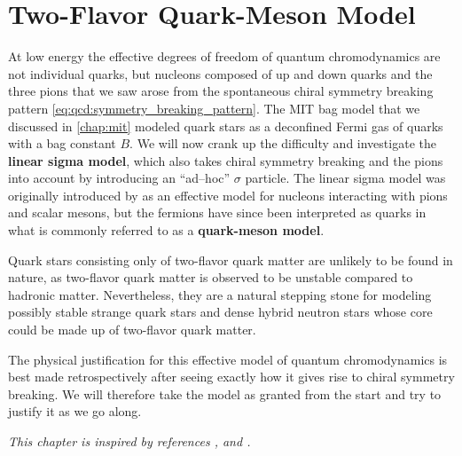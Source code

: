 \chapter{Two-Flavor Quark-Meson Model}
\label{chap:lsm2f}

At low energy the effective degrees of freedom of quantum chromodynamics are not individual quarks,
but nucleons composed of up and down quarks and the three pions that we saw arose from the spontaneous chiral symmetry breaking pattern \eqref{eq:qcd:symmetry_breaking_pattern}.
The MIT bag model that we discussed in \cref{chap:mit} modeled quark stars as a deconfined Fermi gas of quarks with a bag constant $B$.
We will now crank up the difficulty and investigate the \textbf{linear sigma model}, which also takes chiral symmetry breaking and the pions into account by introducing an ``ad--hoc'' $\sigma$ particle.
The linear sigma model was originally introduced by \cite{ref:lsm_original} as an effective model for nucleons interacting with pions and scalar mesons,
but the fermions have since been interpreted as quarks in what is commonly referred to as a \textbf{quark-meson model}.

Quark stars consisting only of two-flavor quark matter are unlikely to be found in nature,
as two-flavor quark matter is observed to be unstable compared to hadronic matter.
Nevertheless, they are a natural stepping stone for modeling possibly stable strange quark stars
and dense hybrid neutron stars whose core could be made up of two-flavor quark matter.

The physical justification for this effective model of quantum chromodynamics is best made retrospectively after seeing exactly how it gives rise to chiral symmetry breaking.
We will therefore take the model as granted from the start and try to justify it as we go along.

\textit{This chapter is inspired by references \cite{ref:lsm_2f}, \cite{ref:lsm_notes} and \cite{ref:jo_lsm_consistent_physical}.}

